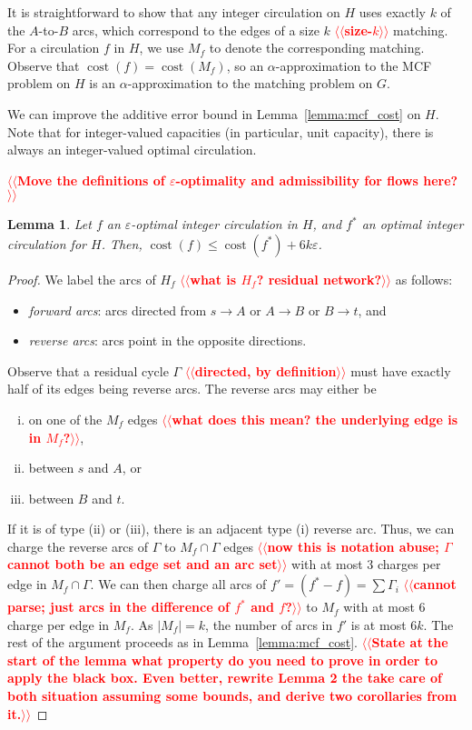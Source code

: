 \documentclass[11pt]{article}
\makeatletter
\def\eps{\varepsilon}
\theoremstyle{plain}
\newtheorem{lemma}{Lemma}[section]
\numberwithin{figure}{section}
\def\cost{\operatorname{cost}}
\def\n@te#1{\textsf{\boldmath \textbf{$\langle\!\langle$#1$\rangle\!\rangle$}}\leavevmode}
\def\note#1{\textcolor{red}{\n@te{#1}}}
\makeatother
\begin{document}
It is straightforward to show that any integer circulation on $H$ uses exactly
$k$ of the $A$-to-$B$ arcs, which correspond to the edges of a size $k$ \note{size-$k$}
matching.
For a circulation $f$ in $H$, we use $M_f$ to denote the
corresponding matching.
Observe that $\cost(f) = \cost(M_f)$, so an $\alpha$-approximation to the MCF
problem on $H$ is an $\alpha$-approximation to the matching problem on $G$.

We can improve the additive error bound in Lemma~\ref{lemma:mcf_cost} on $H$.
Note that for integer-valued capacities (in particular, unit capacity), there is always an
integer-valued optimal circulation.

\note{Move the definitions of $\eps$-optimality and admissibility for flows here?}

\begin{lemma}
\label{lemma:goldberg_cost_add}
Let $f$ an $\eps$-optimal integer circulation in $H$, and $f^*$ an optimal
integer circulation for $H$.
Then, $\cost(f) \leq \cost(f^*) + 6k\eps$.
\end{lemma}

\begin{proof}
We label the arcs of $H_f$ \note{what is $H_f$? residual network?} as follows:
\begin{itemize}\itemsep=0pt
\item \emph{forward arcs}: arcs directed from
$s \to A$ or $A \to B$ or $B \to t$, and \item \emph{reverse arcs}: arcs point in the opposite
directions.
\end{itemize}
Observe that a residual cycle $\Gamma$ \note{directed, by definition} must have exactly half of its edges being
reverse arcs.
The reverse arcs may either be
\begin{enumerate}[(i)]\itemsep=0pt
\item on one of the $M_f$ edges \note{what does this mean? the underlying edge is in $M_f$?},
\item between $s$ and $A$, or
\item between $B$ and $t$.
\end{enumerate}
If it is of type (ii) or (iii), there is an adjacent type (i) reverse arc.
Thus, we can charge the reverse arcs of $\Gamma$ to $M_f \cap \Gamma$ edges \note{now this is notation abuse; $\Gamma$ cannot both be an edge set and an arc set}
with at most 3 charges per edge in $M_f \cap \Gamma$.
We can then charge all arcs of $f' = (f^* - f) = \sum \Gamma_i$ \note{cannot parse; just arcs in the difference of $f^*$ and $f$?} to $M_f$ with
at most 6 charge per edge in $M_f$.
As $|M_f| = k$, the number of arcs in $f'$ is at most $6k$.
The rest of the argument proceeds as in Lemma~\ref{lemma:mcf_cost}. \note{State at the start of the lemma what property do you need to prove in order to apply the black box.  Even better, rewrite Lemma 2 the take care of both situation assuming some bounds, and derive two corollaries from it.}
\end{proof}
\end{document}

